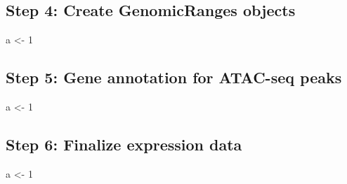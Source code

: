 \documentclass[]{article}
\newenvironment{Shaded}{\begin{snugshade}}{\end{snugshade}}
\newcommand{\CommentTok}[1]{\textcolor[rgb]{0.56,0.35,0.01}{\textit{#1}}}
\newcommand{\DecValTok}[1]{\textcolor[rgb]{0.00,0.00,0.81}{#1}}
\newcommand{\KeywordTok}[1]{\textcolor[rgb]{0.13,0.29,0.53}{\textbf{#1}}}
\newcommand{\NormalTok}[1]{#1}
\newcommand{\OperatorTok}[1]{\textcolor[rgb]{0.81,0.36,0.00}{\textbf{#1}}}
\newcommand{\StringTok}[1]{\textcolor[rgb]{0.31,0.60,0.02}{#1}}
\begin{document}
\begin{Shaded}
\end{Shaded}

\hypertarget{step-4-create-genomicranges-objects}{%
\subsection{Step 4: Create GenomicRanges
objects}\label{step-4-create-genomicranges-objects}}

\begin{Shaded}
\begin{Highlighting}[]
\NormalTok{a <-}\StringTok{ }\DecValTok{1}
\end{Highlighting}
\end{Shaded}

\hypertarget{step-5-gene-annotation-for-atac-seq-peaks}{%
\subsection{Step 5: Gene annotation for ATAC-seq
peaks}\label{step-5-gene-annotation-for-atac-seq-peaks}}

\begin{Shaded}
\begin{Highlighting}[]
\NormalTok{a <-}\StringTok{ }\DecValTok{1}
\end{Highlighting}
\end{Shaded}

\hypertarget{step-6-finalize-expression-data}{%
\subsection{Step 6: Finalize expression
data}\label{step-6-finalize-expression-data}}

\begin{Shaded}
\begin{Highlighting}[]
\NormalTok{a <-}\StringTok{ }\DecValTok{1}
\end{Highlighting}
\end{Shaded}
\end{document}
